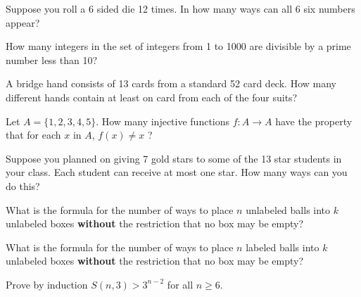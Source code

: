 \begin{exercise}
Suppose you roll a 6 sided die 12 times. In how many ways can all 6 six numbers appear?
\end{exercise}

\begin{exercise}
How many integers in the set of integers from 1 to 1000 are divisible by a prime number less than 10?
\end{exercise}

\begin{exercise} 
A bridge hand consists of 13 cards from a standard 52 card deck.  How many different hands contain at least on card from each of the four suits?
\end{exercise}

\begin{exercise} 
Let $A=\{1,2,3,4,5\}$. How many injective functions $f:A\rightarrow A$  have the property that for each $x$ in $A$, $f(x)\ne x$ ?
\end{exercise}

\begin{exercise} 
Suppose you planned on giving 7 gold stars to some of the 13 star students in your class. Each student can receive at most one star. How many ways can you do this?
\end{exercise}

\begin{exercise} 
What is the formula for the number of ways to place $n$ unlabeled balls into $k$ unlabeled boxes {\bf without} the restriction that no box may be empty?
\end{exercise}

\begin{exercise} 
What is the formula for the number of ways to place $n$ labeled balls into $k$ unlabeled boxes {\bf without} the restriction that no box may be empty?
\end{exercise}



\begin{proofp}
Prove by induction $S(n,3)>3^{n-2}$ for all $n\ge 6$.
\end{proofp}


